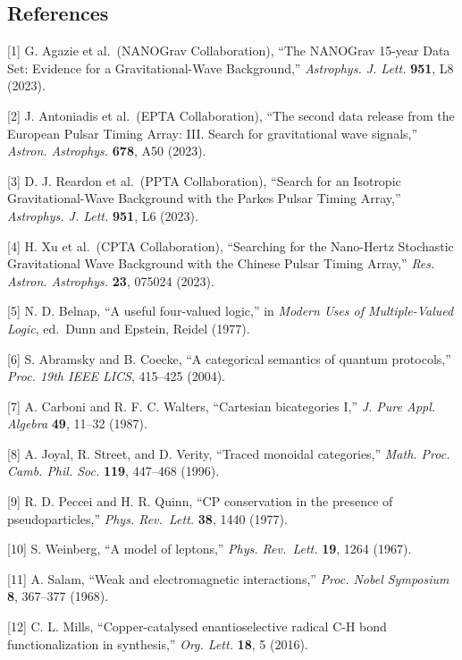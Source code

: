 \documentclass[12pt,a4paper]{article}
\begin{document}
\hypertarget{references}{%
\subsection{References}\label{references}}

{[}1{]} G. Agazie et al.~(NANOGrav Collaboration), ``The NANOGrav
15-year Data Set: Evidence for a Gravitational-Wave Background,''
\emph{Astrophys. J. Lett.} \textbf{951}, L8 (2023).

{[}2{]} J. Antoniadis et al.~(EPTA Collaboration), ``The second data
release from the European Pulsar Timing Array: III. Search for
gravitational wave signals,'' \emph{Astron. Astrophys.} \textbf{678},
A50 (2023).

{[}3{]} D. J. Reardon et al.~(PPTA Collaboration), ``Search for an
Isotropic Gravitational-Wave Background with the Parkes Pulsar Timing
Array,'' \emph{Astrophys. J. Lett.} \textbf{951}, L6 (2023).

{[}4{]} H. Xu et al.~(CPTA Collaboration), ``Searching for the
Nano-Hertz Stochastic Gravitational Wave Background with the Chinese
Pulsar Timing Array,'' \emph{Res. Astron. Astrophys.} \textbf{23},
075024 (2023).

{[}5{]} N. D. Belnap, ``A useful four-valued logic,'' in \emph{Modern
Uses of Multiple-Valued Logic}, ed.~Dunn and Epstein, Reidel (1977).

{[}6{]} S. Abramsky and B. Coecke, ``A categorical semantics of quantum
protocols,'' \emph{Proc. 19th IEEE LICS}, 415--425 (2004).

{[}7{]} A. Carboni and R. F. C. Walters, ``Cartesian bicategories I,''
\emph{J. Pure Appl. Algebra} \textbf{49}, 11--32 (1987).

{[}8{]} A. Joyal, R. Street, and D. Verity, ``Traced monoidal
categories,'' \emph{Math. Proc. Camb. Phil. Soc.} \textbf{119}, 447--468
(1996).

{[}9{]} R. D. Peccei and H. R. Quinn, ``CP conservation in the presence
of pseudoparticles,'' \emph{Phys. Rev.~Lett.} \textbf{38}, 1440 (1977).

{[}10{]} S. Weinberg, ``A model of leptons,'' \emph{Phys. Rev.~Lett.}
\textbf{19}, 1264 (1967).

{[}11{]} A. Salam, ``Weak and electromagnetic interactions,''
\emph{Proc. Nobel Symposium} \textbf{8}, 367--377 (1968).

{[}12{]} C. L. Mills, ``Copper-catalysed enantioselective radical C-H
bond functionalization in synthesis,'' \emph{Org. Lett.} \textbf{18}, 5
(2016).
\end{document}

